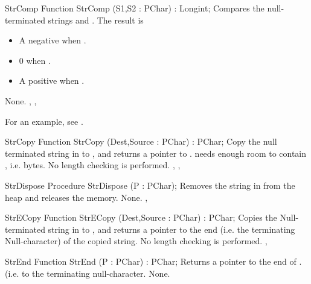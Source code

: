 
\begin{function}{StrComp}
\Declaration
Function StrComp (S1,S2 : PChar) : Longint;
\Description
Compares the null-terminated strings  and .
The result is 
\begin{itemize}
\item A negative  when .
\item 0 when .
\item A positive  when .
\end{itemize}
\Errors
None.
\SeeAlso
{}, , 
\end{function}

For an example, see .

\begin{function}{StrCopy}
\Declaration
Function StrCopy (Dest,Source : PChar) : PChar;
\Description
Copy the null terminated string in  to , and
returns a pointer to .  needs enough room to contain
, i.e.  bytes.
\Errors
No length checking is performed.
\SeeAlso
 , , 
\end{function}


\begin{procedure}{StrDispose}
\Declaration
Procedure StrDispose (P : PChar);
\Description
Removes the string in  from the heap and releases the memory.
\Errors
None.
\SeeAlso
{}, 
\end{procedure}


\begin{function}{StrECopy}
\Declaration
Function StrECopy (Dest,Source : PChar) : PChar;
\Description
Copies the Null-terminated string in  to , and
returns a pointer to the end (i.e. the terminating Null-character) of the
copied string.
\Errors
No length checking is performed.
\SeeAlso
{}, 
\end{function}


\begin{function}{StrEnd}
\Declaration
Function StrEnd (P : PChar) : PChar;
\Description
Returns a pointer to the end of . (i.e. to the terminating
null-character.
\Errors
None.
\SeeAlso
{}
\end{function}

